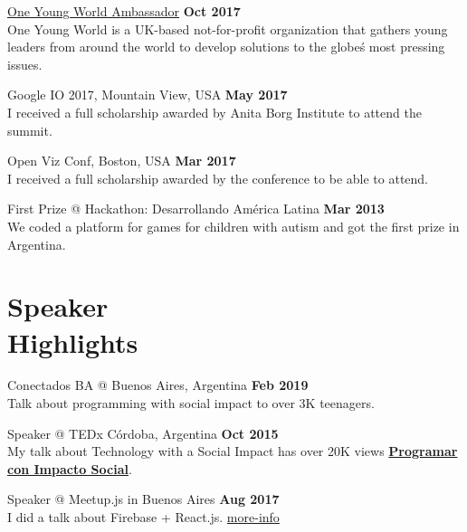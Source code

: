 \documentclass[margin,line]{resume}
\begin{document}
\begin{resume}
\begin{list2}
\item \href{oneyoungworld.com/ambassador-projects/chicas-en-tecnología}{One Young World Ambassador}
 \hfill \textbf{Oct 2017} \\
One Young World is a UK-based not-for-profit organization that gathers young leaders from around the world to develop solutions to the globe\'s most pressing issues.

\item Google IO 2017, Mountain View, USA \hfill \textbf{May 2017}
\\
I received a full scholarship awarded by Anita Borg Institute to attend the summit.


\item Open Viz Conf, Boston, USA \hfill \textbf{Mar 2017}
\\ I received a full scholarship awarded by the conference to be able to attend.

\item First Prize @ Hackathon: Desarrollando Am\'erica Latina \hfill \textbf{Mar 2013} \\
We coded a platform for games for children with autism and got the first prize in Argentina.


\end{list2}


\section{\mysidestyle Speaker\\Highlights}

\begin{list2}

\item Conectados BA @ Buenos Aires, Argentina \hfill \textbf{Feb 2019}  \\
Talk about programming with social impact to over 3K teenagers.

\item Speaker @ TEDx C\'ordoba, Argentina \hfill \textbf{Oct 2015}  \\
My talk about Technology with a Social Impact has over 20K views \href{https://www.youtube.com/watch?v=0cx8UwdN-g4&t=1s}{\textbf{Programar con Impacto Social}}.


\item Speaker @ Meetup.js in Buenos Aires \hfill \textbf{Aug 2017}
\\
I did a talk about Firebase + React.js. \href{https://www.meetup.com/Meetup-js/events/242439836/?eventId=242439836}{more-info}


\end{list2}
\end{resume}
\end{document}
